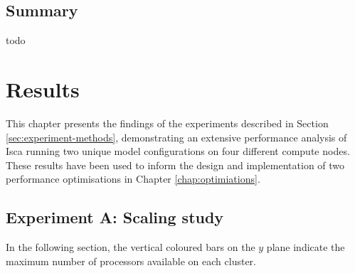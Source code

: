 \documentclass[a4paper,11pt]{report}
\begin{document}
\section{Summary}
todo


\chapter{Results}
\label{chap:results}
This chapter presents the findings of the experiments described in Section \ref{sec:experiment-methods}, demonstrating an extensive performance analysis of Isca running two unique model configurations on four different compute nodes. These results have been used to inform the design and implementation of two performance optimisations in Chapter \ref{chap:optimiations}. 
\section{Experiment A: Scaling study} 
In the following section, the vertical coloured bars on the $y$ plane indicate the maximum number of processors available on each cluster.
 
\end{document}
